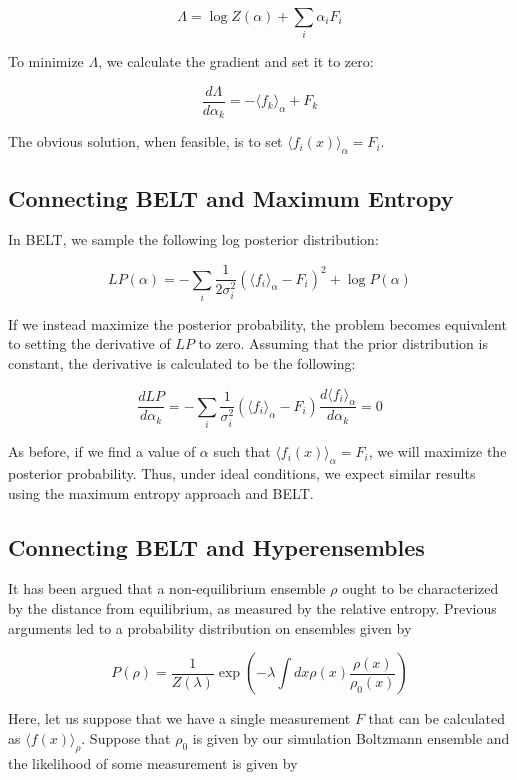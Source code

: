 \documentclass[12pt]{article}
\begin{document}
$$\Lambda = \log Z(\alpha) + \sum_i \alpha_i F_i$$

To minimize $\Lambda$, we calculate the gradient and set it to zero:

$$\frac{d\Lambda}{d\alpha_k} = -\langle f_k \rangle_\alpha + F_k$$

The obvious solution, when feasible, is to set $\langle f_i(x) \rangle_\alpha = F_i$.  


\subsection*{Connecting BELT and Maximum Entropy}


In BELT, we sample the following log posterior distribution:

$$LP(\alpha) = -\sum_i \frac{1}{2\sigma_i^2}(\langle f_i\rangle _\alpha - F_i)^2 + \log P(\alpha)$$

If we instead maximize the posterior probability, the problem becomes equivalent to setting the derivative of $LP$ to zero.  Assuming that the prior distribution is constant, the derivative is calculated to be the following:

$$ \frac{dLP}{d\alpha_k} =  -\sum_i \frac{1}{\sigma_i^2} (\langle f_i\rangle _\alpha - F_i) \frac{d\langle f_i\rangle _\alpha}{d\alpha_k} = 0$$

As before, if we find a value of $\alpha$ such that $\langle f_i(x) \rangle_\alpha = F_i$, we will maximize the posterior probability.  Thus, under ideal conditions, we expect similar results using the maximum entropy approach and BELT.  


\newpage

\subsection*{Connecting BELT and Hyperensembles}

It has been argued \cite{crooks2007beyond} that a non-equilibrium ensemble $\rho$ ought to be characterized by the distance from equilibrium, as measured by the relative entropy.  Previous arguments led to a probability distribution on ensembles given by 

$$P(\rho) = \frac{1}{Z(\lambda)} \exp(- \lambda \int dx \rho(x)\frac{\rho(x)}{\rho_0(x)})$$

Here, let us suppose that we have a single measurement $F$ that can be calculated as $\langle f(x) \rangle_\rho$.  Suppose that $\rho_0$ is given by our simulation Boltzmann ensemble and the likelihood of some measurement is given by
\end{document}
